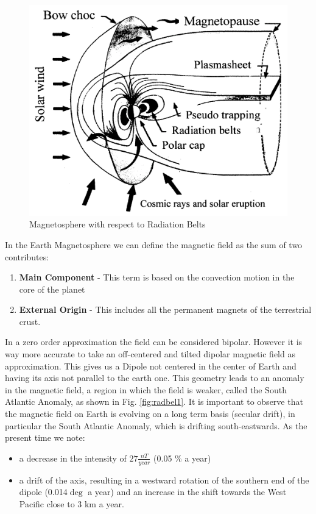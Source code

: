 \documentclass[./dissertation.tex]{subfiles}
\begin{document}
\begin{figure}[h!]
\centering
  \includegraphics[scale = 0.30]{Figures/magnetosphere.png}
  \caption{Magnetosphere with respect to Radiation Belts \cite{bib2}}
  \label{fig:magnetosphere}
\end{figure}

In the Earth Magnetosphere we can define the magnetic field as the sum of two contributes:
\begin{enumerate}
    \item \textbf{Main Component} - This term is based on the convection motion in the core of the planet
    \item \textbf{External Origin} - This includes all the permanent magnets of the terrestrial crust.
\end{enumerate}

In a zero order approximation the field can be considered bipolar. However it is way more accurate to take an off-centered and tilted dipolar magnetic field as approximation. This gives us a Dipole not centered in the center of Earth and having its axis not parallel to the earth one. This geometry leads to an anomaly in the magnetic field, a region in which the  field is weaker, called the South Atlantic Anomaly, as shown in Fig. \ref{fig:radbel1}. It is important to observe that the magnetic field on Earth is evolving on a long term basis (secular drift), in particular the South Atlantic Anomaly, which is drifting south-eastwards. As the present time we note:
\begin{itemize}
    \item a decrease in the intensity of $27\frac{nT}{year}$ (0.05 \% a year) \cite{bib2}
    \item a drift of the axis, resulting in a westward rotation of the
southern end of the dipole (0.014$\deg$ a year) and an increase in
the shift towards the West Pacific close to 3 km a year. \cite{bib2}
\end{itemize}
\end{document}
